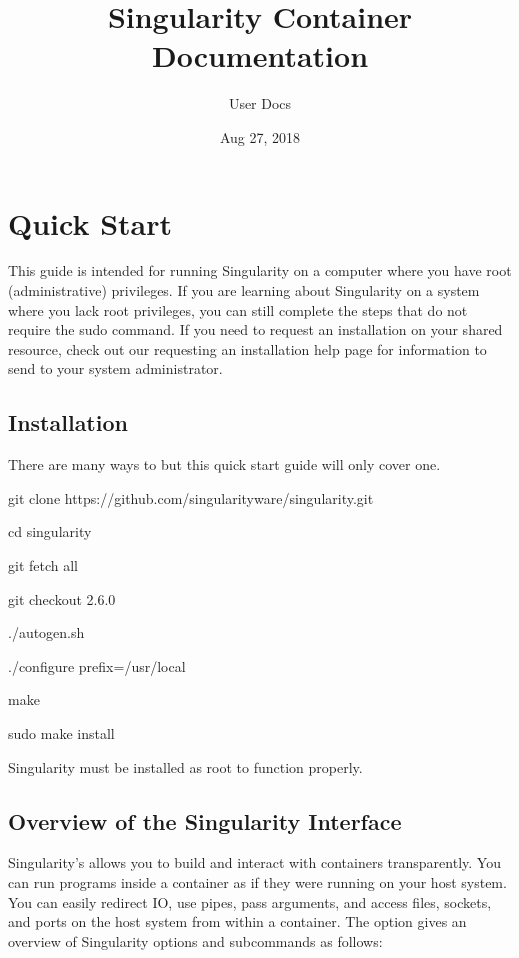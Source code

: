 \documentclass[letterpaper,10pt,english]{sphinxmanual}
\title{Singularity Container Documentation}
\date{Aug 27, 2018}
\author{User Docs}
\begin{document}
\maketitle
\sphinxtableofcontents
{}\label{\detokenize{index::doc}}



\chapter{Quick Start}
\label{\detokenize{quick_start:quick-start}}\label{\detokenize{quick_start:id1}}\label{\detokenize{quick_start::doc}}\label{\detokenize{quick_start:sec-quickstart}}
This guide is intended for running Singularity on a computer where you
have root (administrative) privileges. If you are learning about
Singularity on a system where you lack root privileges, you can still
complete the steps that do not require the sudo command. If you need to
request an installation on your shared resource, check out our requesting an installation help page for information to send to your
system administrator.


\section{Installation}
\label{\detokenize{quick_start:installation}}\label{\detokenize{quick_start:id2}}
There are many ways to {\hyperref[\detokenize{quick_start:installation}]{}} but this quick start guide will only cover one.

%
\begin{sphinxVerbatim}[commandchars=\\\{\}]
git clone https://github.com/singularityware/singularity.git

cd singularity

git fetch \PYGZhy{}\PYGZhy{}all

git checkout 2.6.0

./autogen.sh

./configure \PYGZhy{}\PYGZhy{}prefix=/usr/local

make

sudo make install
\end{sphinxVerbatim}

Singularity must be installed as root to function properly.


\section{Overview of the Singularity Interface}
\label{\detokenize{quick_start:overview-of-the-singularity-interface}}
Singularity’s {\hyperref[\detokenize{appendix:command-usage}]{}} allows you to build and interact with containers
transparently. You can run programs inside a container as if they were
running on your host system. You can easily redirect IO, use pipes,
pass arguments, and access files, sockets, and ports on the host
system from within a container.
The  option gives an overview of Singularity options and subcommands as
follows:
\end{document}
